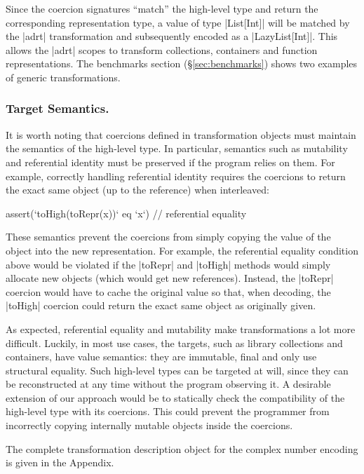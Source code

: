 Since the coercion signatures ``match'' the high-level type and return the corresponding representation type, a value of type |List[Int]| will be matched by the |adrt| transformation and subsequently encoded as a |LazyList[Int]|. This allows the |adrt| scopes to transform collections, containers and function representations. The benchmarks section (\S\ref{sec:benchmarks}) shows two examples of generic transformations.


\subsubsection*{Target Semantics.} It is worth noting that coercions defined in transformation objects must maintain the semantics of the high-level type. In particular, semantics such as mutability and referential identity must be preserved if the program relies on them. For example, correctly handling referential identity requires the coercions to return the exact same object (up to the reference) when interleaved:

\begin{lstlisting-nobreak}
assert(`toHigh(toRepr(x))` eq `x`) // referential equality
\end{lstlisting-nobreak}

These semantics prevent the coercions from simply copying the value of the object into the new representation.
For example, the referential equality condition above would be violated if the |toRepr| and |toHigh| methods would simply allocate new objects (which would get new references). Instead, the |toRepr| coercion would have to cache the original value so that, when decoding, the |toHigh| coercion could return the exact same object as originally given.

As expected, referential equality and mutability make transformations a lot more difficult. Luckily, in most use cases, the targets, such as library collections and containers, have value semantics: they are immutable, final and only use structural equality. Such high-level types can be targeted at will, since they can be reconstructed at any time without the program observing it. A desirable extension of our approach would be to statically check the compatibility of the high-level type with its coercions. This could prevent the programmer from incorrectly copying internally mutable objects inside the coercions.

The complete transformation description object for the complex number encoding is given in the Appendix.

